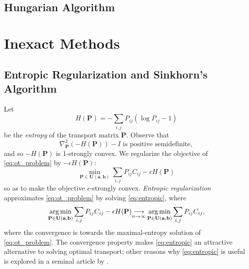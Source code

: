 \documentclass{article}
\renewcommand{\b}{\mathbf}
\theoremstyle{definition}
\theoremstyle{remark}
\newcommand{\feasible}{\b U(\b a, \b b)}
\begin{document}

\subsection{Hungarian Algorithm} %
\label{sub:hungarian_algorithm}


\section{Inexact Methods} %
\label{sec:inexact_methods}

\subsection{Entropic Regularization and Sinkhorn's Algorithm} %
\label{sub:entropic_regularization_and_sinkhorn_s_algorithm}

Let \[H(\b P)= -\sum_{i,j} P_{ij}(\log P_{ij} - 1)\] be the \emph{entropy} of
 the transport matrix $\b P$. Observe that \[
\nabla^2_{\b P} (-H(\b P)) - I \text{ is positive semidefinite},
\]
and so $-H(\b P)$ is 1-strongly convex. We regularize the objective of 
\eqref{eq:ot_problem} by $-\epsilon H(\b P):$ \begin{equation}
\label{eq:entropic}
  \min_{\b P \in \feasible} \sum_{i,j}P_{ij}C_{ij} - \epsilon H(\b P) 
\tag{Entropic Regularization}
\end{equation}
so as to make the objective $\epsilon$-strongly convex. \emph{Entropic
 regularization} approximates \eqref{eq:ot_problem} by solving 
\eqref{eq:entropic}, where \[
\argmin_{\b P \in \feasible} \sum_{i,j}P_{ij}C_{ij} - \epsilon H(\b P) 
 {\underset{n\to\infty}{\longrightarrow}}
 \argmin_{\b P \in \feasible} \sum_{i,j}P_{ij}C_{ij},
\]
where the convergence is towards the maximal-entropy solution of 
\eqref{eq:ot_problem}. The convergence property makes \eqref{eq:entropic} an
 attractive alternative to solving optimal transport; other reasons why 
\eqref{eq:entropic} is useful is explored in a seminal article by 
\cite{cuturi2013sinkhorn}. 
\end{document}
